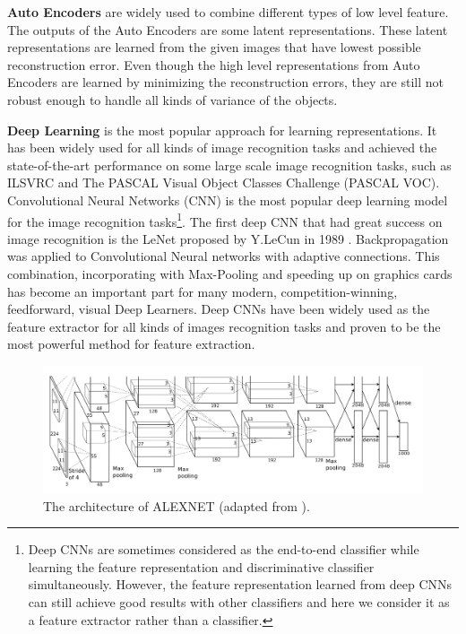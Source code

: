 \textbf{Auto Encoders} are widely used to combine different types of low level feature. The outputs of the Auto Encoders are some latent representations. These latent representations are learned from the given images that have lowest possible reconstruction error. Even though the high level representations from Auto Encoders are learned by minimizing the reconstruction errors, they are still not robust enough to handle all kinds of variance of the objects.

\textbf{Deep Learning} is the most popular approach for learning representations. It has been widely used for all kinds of image recognition tasks and achieved the state-of-the-art performance on some large scale image recognition tasks, such as ILSVRC and The PASCAL Visual Object Classes Challenge (PASCAL VOC). 
Convolutional Neural Networks (CNN) is the most popular deep learning model for the image recognition tasks\footnote{Deep CNNs are sometimes considered as the end-to-end classifier while learning the feature representation and discriminative classifier simultaneously. However, the feature representation learned from deep CNNs can still achieve good results with other classifiers and here we consider it as a feature extractor rather than a classifier.}. The first deep CNN that had great success on image recognition is the LeNet proposed by Y.LeCun in 1989 \cite{lecun1989backpropagation}. Backpropagation was applied to Convolutional Neural networks with adaptive connections. This combination, incorporating with Max-Pooling and speeding up on graphics cards has become an important part for  many modern, competition-winning, feedforward, visual Deep Learners. Deep CNNs have been widely used as the feature extractor for all kinds of images recognition tasks and proven to be the most powerful method for feature extraction.
\begin{figure}
	\centering
	\includegraphics[scale=.3]{introduction/fig/alexnet.png}
	\caption{The architecture of ALEXNET (adapted from \cite{krizhevsky2012imagenet}).}\label{fig:intro:alex}
\end{figure}

